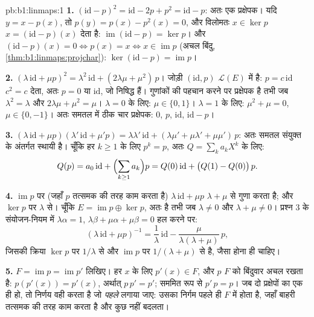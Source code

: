 \begin{solution}{pb:b1:linmaps:1}
\textbf{1.} $(\mathrm{id} - p)^2 = \mathrm{id} - 2p + p^2 = \mathrm{id} -
p$: अतः एक प्रक्षेपक। यदि $y = x - p(x)$, तो $p(y) = p(x) - p^2(x) = 0$, और
विलोमतः $x \in \ker p$ $x = (\mathrm{id} - p)(x)$ देता है:
$\operatorname{im}(\mathrm{id} - p) = \ker p$। और $(\mathrm{id} - p)(x) = 0
\iff p(x) = x \iff x \in \operatorname{im} p$ (अचल बिंदु,
\cref{thm:b1:linmaps:projchar}): $\ker(\mathrm{id} - p) = \operatorname{im}
p$।

\textbf{2.} $(\lambda\,\mathrm{id} + \mu p)^2 = \lambda^2\,\mathrm{id} +
(2\lambda\mu + \mu^2)\,p$। जोड़ी $(\mathrm{id}, p)$ $\mathcal{L}(E)$ में
 है: $p = c\, \mathrm{id}$ $c^2 = c$ देता, अतः $p = 0$ या
$\mathrm{id}$, जो निषिद्ध हैं। गुणांकों की पहचान करने पर 
प्रक्षेपक है तभी जब $\lambda^2 = \lambda$ और $2\lambda\mu + \mu^2 = \mu$।
$\lambda = 0$ के लिए: $\mu \in \{0, 1\}$। $\lambda = 1$ के लिए: $\mu^2 + \mu
= 0$, $\mu \in \{0, -1\}$। अतः समतल में ठीक चार प्रक्षेपक: $0$, $p$,
$\mathrm{id}$, $\mathrm{id} - p$।

\textbf{3.} $(\lambda\,\mathrm{id} + \mu p)(\lambda'\,\mathrm{id} + \mu' p)
= \lambda\lambda'\,\mathrm{id} + (\lambda\mu' + \mu\lambda' + \mu\mu')\,p$:
अतः समतल संयुक्त  के अंतर्गत स्थायी है। चूँकि हर $k \geq 1$ के
लिए $p^k = p$, अतः $Q = \sum_k a_k X^k$ के लिए:
\[
Q(p) = a_0\,\mathrm{id} + \Bigl(\sum_{k \geq 1} a_k\Bigr) p
= Q(0)\,\mathrm{id} + \bigl(Q(1) - Q(0)\bigr)\,p .
\]

\textbf{4.} $\operatorname{im} p$ पर (जहाँ $p$ तत्समक की तरह काम करता है)
$\lambda\,\mathrm{id} + \mu p$ $\lambda + \mu$ से गुणा करता है; और $\ker p$
पर $\lambda$ से। चूँकि $E = \operatorname{im} p \oplus \ker p$, अतः
  है तभी जब $\lambda \neq 0$ और $\lambda + \mu \neq
0$। प्रश्न 3 के संयोजन-नियम में $\lambda\alpha = 1$, $\lambda\beta +
\mu\alpha + \mu\beta = 0$ हल करने पर:
\[
(\lambda\,\mathrm{id} + \mu p)^{-1}
= \frac1\lambda\,\mathrm{id} -
\frac{\mu}{\lambda(\lambda + \mu)}\,p ,
\]
जिसकी क्रिया $\ker p$ पर $1/\lambda$ से और $\operatorname{im} p$ पर
$1/(\lambda + \mu)$ से है, जैसा होना ही चाहिए।

\textbf{5.} $F = \operatorname{im} p = \operatorname{im} p'$ लिखिए। हर $x$
के लिए $p'(x) \in F$, और $p$ $F$ को बिंदुवार अचल रखता है: $p(p'(x)) =
p'(x)$, अर्थात् $p\,p' = p'$; सममित रूप से $p'\,p = p$। जब दो प्रक्षेपों का
 एक ही हो, तो निर्णय वही करता है जो \emph{पहले} लगाया जाए: उसका
निर्गम पहले ही $F$ में होता है, जहाँ बाहरी  तत्समक की तरह काम करता
है और कुछ नहीं बदलता।


\end{solution}
